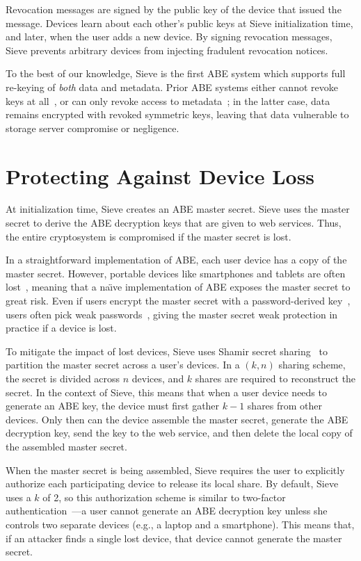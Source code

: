 Revocation messages are signed by the public
key of the device that issued the message.
Devices learn about each other's public keys
at Sieve initialization time, and later, when
the user adds a new device. By signing revocation
messages, Sieve prevents arbitrary devices
from injecting fradulent revocation notices.

To the best of our knowledge, Sieve is the
first ABE system which supports full re-keying
of \emph{both} data and metadata. Prior ABE systems either
cannot revoke keys at all~\cite{privio}, or can
only revoke access to metadata~\cite{persona,aauth};
in the latter case, data remains encrypted with
revoked symmetric keys, leaving that data vulnerable
to storage server compromise or negligence.


\section{Protecting Against Device Loss}
\label{sec:secretSharing}

At initialization time, Sieve creates an ABE
master secret. Sieve uses the master secret
to derive the ABE decryption keys that are
given to web services. Thus, the entire
cryptosystem is compromised if the master
secret is lost.

In a straightforward implementation of ABE, each
user device has a copy of the master secret.
However, portable devices like smartphones and
tablets are often lost~\cite{wang2012smartphone},
meaning that a na\"{\i}ve implementation of ABE
exposes the master secret to great risk. Even if
users encrypt the master secret with a
password-derived key~\cite{pbkdf}, users often
pick weak passwords~\cite{gaw2006password},
giving the master secret weak protection in
practice if a device is lost.

To mitigate the impact of lost devices, Sieve
uses Shamir secret sharing~\cite{shamir} to
partition the master secret across a user's
devices. In a $(k,n)$ sharing scheme, the
secret is divided across $n$ devices, and
$k$ shares are required to reconstruct the
secret. In the context of Sieve, this means
that when a user device needs to generate
an ABE key, the device must first gather $k-1$
shares from other devices. Only then can the
device assemble the master secret, generate
the ABE decryption key, send the key to the
web service, and then delete the local copy
of the assembled master secret.

When the master secret is being assembled,
Sieve requires the user to explicitly authorize
each participating device to release its local
share. By default, Sieve uses a $k$ of 2, so
this authorization scheme is similar to
two-factor authentication~\cite{twofactor}---a user
cannot generate an ABE decryption key unless
she controls two separate devices (e.g., a
laptop and a smartphone). This means that,
if an attacker finds a single lost device,
that device cannot generate the master secret.

